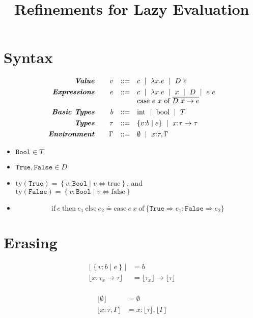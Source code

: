 \documentclass[10pt,a4paper]{article}
\title{Refinements for Lazy Evaluation}
\newcommand\efun[2]{\ensuremath{\lambda #1 . #2}}
\newcommand\eapp[2]{\ensuremath{#1 \ #2}}
\newcommand\edata[2]{\ensuremath{#1 \ #2}}
\newcommand\ecase[5]{\ensuremath{\text{case}\ #1\ #2\ \text{of}\ \overline{\edata{#3}{#4} \rightarrow #5}}}
\newcommand\etrue{\ensuremath{\text{true}}}
\newcommand\efalse{\ensuremath{\text{false}}}
\newcommand\tint{\ensuremath{\text{int}}}
\newcommand\tbool{\ensuremath{\text{bool}}}
\newcommand\tref[3]{\ensuremath{\left\lbrace {#1} \colon {#2} \mid {#3} \right\rbrace}}
\newcommand\tconref[4]{\tref{#3}{\tcon{#1}{#2}}{#4}}
\newcommand\tcon[2]{\ensuremath{#1\ #2}}
\newcommand\tfun[3]{\ensuremath{#1\colon #2 \rightarrow #3}}
\newcommand\ty[1]{\ensuremath{\text{ty}({#1})}}
\newcommand\erase[1]{\ensuremath{\lfloor #1 \rfloor}}
\begin{document}
\section*{Syntax}
$$
\begin{array}{rrcl}
\emphbf{Value} \quad 
  & v
  & ::= 
  &   	 c 
  \spmid \efun{x}{e} 
  \spmid \edata{D}{\overline{e}}
  \\[0.05in] 


\emphbf{Expressions} \quad 
  & e
  & ::= 
  &   	 c 
  \spmid \efun{x}{e} 
  \spmid x 
  \spmid D 
  \spmid \eapp{e}{e}  
  \\ &&& \ecase{e}{x}{D}{\overline{x}}{e}
  \\[0.05in] 

\emphbf{Basic Types} \quad 
  & b
  & ::=  
  & 	\tint \spmid \tbool \spmid T
  \\[0.05in] 

\emphbf{Types} \quad 
  & \tau
  & ::=  
  & 	\tref{v}{b}{e}
  \spmid \tfun{x}{\tau}{\tau}    
  \\[0.05in] 

\emphbf{Environment} \quad 
  & \Gamma
  & ::= 
  &     \emptyset \spmid x\colon \tau, \Gamma

\end{array}
$$

\begin{itemize}
\item $\texttt{Bool}\in T$
\item $\texttt{True}, \texttt{False} \in D$
\item $\ty{\texttt{True}} = \tref{v}{\texttt{Bool}}{v \Leftrightarrow \etrue}$, and
$\ty{\texttt{False}} = \tref{v}{\texttt{Bool}}{v \Leftrightarrow \efalse}$
\item
$$\text{if}\ e\ \text{then}\ e_1\ \text{else}\ e_2 \doteq 
\text{case}\ e\ x\ \text{of}\ \{\texttt{True}\Rightarrow e_1;\texttt{False}\Rightarrow e_2 \}
$$
\end{itemize}
\section*{Erasing}
\begin{align*}
\erase{\tref{v}{b}{e}}&=b\\
\erase{\tfun{x}{\tau_x}{\tau}}&= \erase{\tau_x} \rightarrow \erase{\tau}\\
\end{align*}

\begin{align*}
\erase{\emptyset}&=\emptyset\\
\erase{x\colon\tau, \Gamma}&= x\colon\erase{\tau},\erase{\Gamma}
\end{align*}
\end{document}
